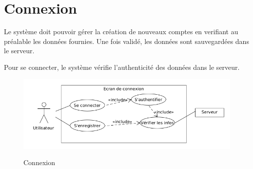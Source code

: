 \documentclass[../besoin_sys.tex]{subfiles}
\begin{document}
\section{Connexion}
Le système doit pouvoir gérer la création de nouveaux comptes en verifiant au préalable les données fournies.
Une fois validé, les données sont sauvegardées dans le serveur.

Pour se connecter, le système vérifie l'authenticité des données dans le serveur.

\begin{figure}[h]
    \centering
    \includegraphics[scale=0.6]{img_fonctionnel/use_case_systeme_connexion.png}
    \label{fig:sys_connexion}
    \caption{Connexion}
\end{figure}
\newpage
\end{document}
